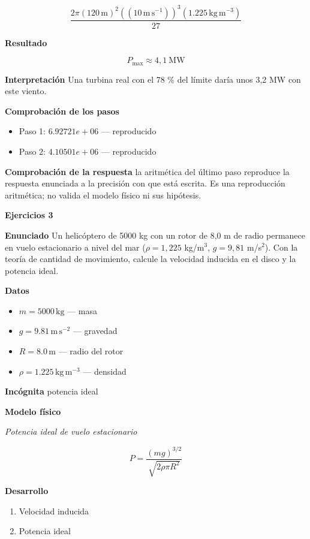 \documentclass[10pt,openany]{book}
\begin{document}
\[
\frac{2 \pi \left(120\,\mathrm{m}\right)^{2} \left(\left(10\,\mathrm{m}\,\mathrm{s}^{-1}\right)\right)^{3} \left(1.225\,\mathrm{kg}\,\mathrm{m}^{-3}\right)}{27}
\]

\noindent\textbf{Resultado}

\[
P_{\max} \approx 4{,}1\ \mathrm{MW}
\]

\noindent\textbf{Interpretación}
Una turbina real con el 78 \% del límite daría unos 3,2 MW con este viento.

\noindent\textbf{Comprobación de los pasos}
\begin{itemize}
\item Paso 1: $6.92721e+06$ — reproducido
\item Paso 2: $4.10501e+06$ — reproducido
\end{itemize}

\noindent\textbf{Comprobación de la respuesta} la aritmética del último paso reproduce la respuesta enunciada a la precisión con que está escrita. Es una reproducción aritmética; no valida el modelo físico ni sus hipótesis.

\noindent\textbf{Ejercicios 3}

\noindent\textbf{Enunciado}
Un helicóptero de 5000 kg con un rotor de 8,0 m de radio permanece en vuelo estacionario a nivel del mar (\(\rho = 1{,}225\) kg/m\(^3\), \(g = 9{,}81\) m/s\(^2\)). Con la teoría de cantidad de movimiento, calcule la velocidad inducida en el disco y la potencia ideal.

\noindent\textbf{Datos}
\begin{itemize}
\item $m = 5000\,\mathrm{kg}$ — masa
\item $g = 9.81\,\mathrm{m}\,\mathrm{s}^{-2}$ — gravedad
\item $R = 8.0\,\mathrm{m}$ — radio del rotor
\item $\rho = 1.225\,\mathrm{kg}\,\mathrm{m}^{-3}$ — densidad
\end{itemize}

\noindent\textbf{Incógnita}
potencia ideal

\noindent\textbf{Modelo físico}

\noindent\textit{Potencia ideal de vuelo estacionario}

\[
P = \frac{(m g)^{3/2}}{\sqrt{2\rho\pi R^{2}}}
\]

\noindent\textbf{Desarrollo}
\begin{enumerate}
\item
Velocidad inducida
\item
Potencia ideal
\end{enumerate}
\end{document}
